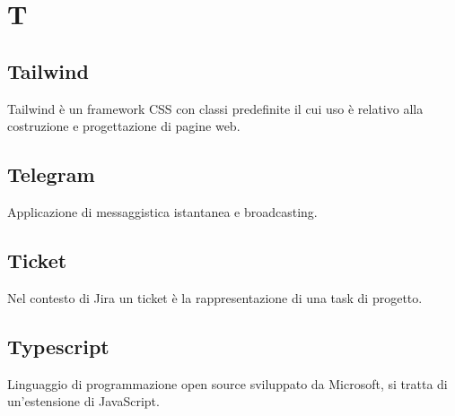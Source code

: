\chapter{T}

\section{Tailwind}
Tailwind  è un framework CSS con classi predefinite il cui uso è relativo alla costruzione e progettazione di pagine web.

\section{Telegram}
Applicazione di messaggistica istantanea e broadcasting.
\section{Ticket}\label{sec:Tickets}
Nel contesto di Jira un ticket è la rappresentazione di una task di progetto.
\section{Typescript}
Linguaggio di programmazione open source sviluppato da Microsoft, si tratta di un'estensione di JavaScript. 
